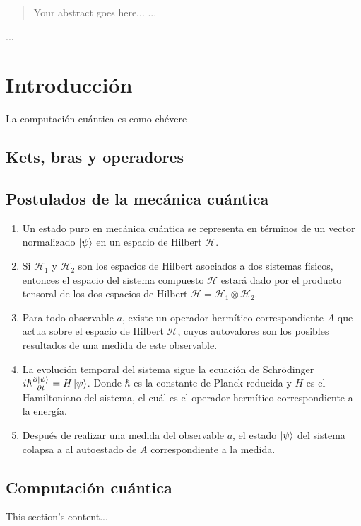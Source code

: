 \documentclass[11pt, spanish]{report}
\begin{document}
\begin{abstract}
Your abstract goes here...
...
\end{abstract}
...

\chapter{Introducción}
La computación cuántica es como chévere

\section{Kets, bras y operadores}

\section{Postulados de la mecánica cuántica}
\begin{enumerate}
\item Un estado puro en mecánica cuántica se representa en términos de
  un vector normalizado $\ket{\psi}$ en un espacio de Hilbert
  $\mathcal{H}$.
\item Si $\mathcal{H}_1$ y $\mathcal{H}_2$ son los espacios de Hilbert
  asociados a dos sistemas físicos, entonces el espacio del sistema
  compuesto $\mathcal{H}$ estará dado por el producto tensoral de los
  dos espacios de Hilbert
  $\mathcal{H} = \mathcal{H}_1 \otimes \mathcal{H}_2$.
\item Para todo observable $a$, existe un operador hermítico
  correspondiente $A$ que actua sobre el espacio de Hilbert
  $\mathcal{H}$, cuyos autovalores son los posibles resultados de una
  medida de este observable.
\item La evolución temporal del sistema sigue la ecuación de
  Schrödinger
  $i \hbar \frac{\partial \ket{\psi}}{\partial t} = H
  \ket{\psi}$. Donde $\hbar$ es la constante de Planck reducida y $H$
  es el Hamiltoniano del sistema, el cuál es el operador hermítico
  correspondiente a la energía.
\item Después de realizar una medida del observable $a$, el estado
  $\ket{\psi}$ del sistema colapsa a al autoestado de $A$
  correspondiente a la medida.
\end{enumerate}

\section{Computación cuántica}
This section's content...
\end{document}
